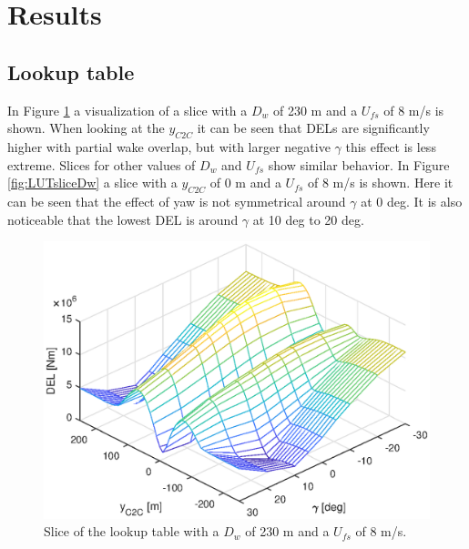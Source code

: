 \section{Results}

\subsection{Lookup table}
In Figure \ref{fig:LUTsliceC2C} a visualization of a slice with a $D_{w}$ of 230 m and a $U_{fs}$ of 8 m/s is shown. When looking at the $y_{C2C}$ it can be seen that DELs are significantly higher with partial wake overlap, but with larger negative $\gamma$ this effect is less extreme. Slices for other values of $D_{w}$ and $U_{fs}$ show similar behavior. In Figure \ref{fig:LUTsliceDw} a slice with a $y_{C2C}$ of 0 m and a $U_{fs}$ of 8 m/s is shown. Here it can be seen that the effect of yaw is not symmetrical around $\gamma$ at 0 deg. It is also noticeable that the lowest DEL is around $\gamma$ at 10 deg to 20 deg.

\begin{figure}
	\includegraphics[width=\linewidth]{./Figures/LUTslice_Dw230_Ufs8.eps}
	\caption{Slice of the lookup table with a $D_{w}$ of 230 m and a $U_{fs}$ of 8 m/s. }
	\label{fig:LUTsliceC2C}
\end{figure}

